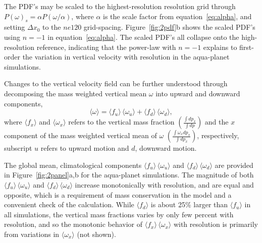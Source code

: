 \documentclass[times]{qjrms4}
\begin{document}
The PDF's may be scaled to the highest-resolution resolution grid through $P(\omega)_s = \alpha P (\omega / \alpha)$, where $\alpha$ is the scale factor from equation~\ref{eq:alpha}, and setting $\Delta x_0$ to the $ne120$ grid-spacing. Figure~\ref{fig:2pdf}b shows the scaled PDF's using $n=-1$ in equation~\ref{eq:alpha}. The scaled PDF's all collapse onto the high-resolution reference, indicating that the power-law with $n=-1$ explains to first-order the variation in vertical velocity with resolution in the aqua-planet simulations. 

Changes to the vertical velocity field can be further understood through decomposing the mass weighted vertical mean $\omega$ into upward and downward components,
\begin{equation}
\langle \omega \rangle =\langle f_{u} \rangle \, \langle \omega_{u} \rangle + \langle f_{d} \rangle \, \langle \omega_{d} \rangle, \label{eq:omega}
\end{equation}
where $\langle f_x \rangle$ and $\langle \omega_x \rangle$ refers to the vertical mass fraction $ \left( \frac{\int dp_x}{\int dp} \right)$ and the $x$ component of the mass weighted vertical mean of $\omega$ $ \left( \frac{\int \omega_x dp_x}{\int dp_x} \right)$, respectively, subscript $u$ refers to upward motion and $d$, downward motion.

The global mean, climatological components $\langle f_{u} \rangle \, \langle \omega_{u} \rangle$ and $\langle f_{d} \rangle \, \langle \omega_{d} \rangle$ are provided in Figure~\ref{fig:2panel}a,b for the aqua-planet simulations. The magnitude of both $\langle f_{u} \rangle \, \langle \omega_{u} \rangle$ and $\langle f_{d} \rangle \, \langle \omega_{d} \rangle$ increase monotonically with resolution, and are equal and opposite, which is a requirement of mass conservation in the model and a convenient check of the calculation. While $\langle f_{d} \rangle$ is about 25\% larger than $\langle f_{u} \rangle$ in all simulations, the vertical mass fractions varies by only few percent with resolution, and so the monotonic behavior of $\langle f_{x} \rangle \, \langle \omega_{x} \rangle$ with resolution is primarily from variations in $ \langle \omega_{x} \rangle$ (not shown).
\end{document}
